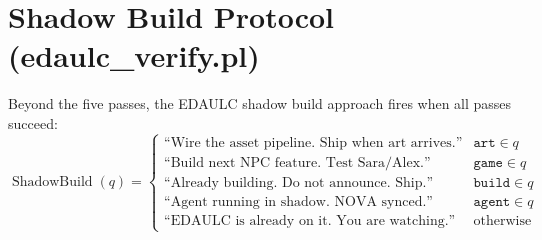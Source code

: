 \documentclass{article}
\begin{document}
\section{Shadow Build Protocol (edaulc\_verify.pl)}
Beyond the five passes, the EDAULC shadow build approach fires when all passes succeed:
\begin{equation}
  \operatorname{ShadowBuild}(q) = \begin{cases}
    \text{``Wire the asset pipeline. Ship when art arrives.''} & \texttt{art} \in q \\
    \text{``Build next NPC feature. Test Sara/Alex.''} & \texttt{game} \in q \\
    \text{``Already building. Do not announce. Ship.''} & \texttt{build} \in q \\
    \text{``Agent running in shadow. NOVA synced.''} & \texttt{agent} \in q \\
    \text{``EDAULC is already on it. You are watching.''} & \text{otherwise}
  \end{cases}
\end{equation}
\end{document}
